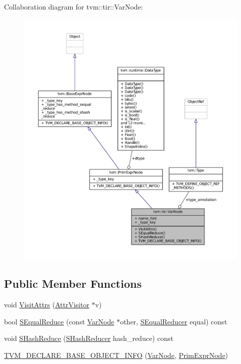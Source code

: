 Collaboration diagram for tvm\+:\+:tir\+:\+:Var\+Node\+:
\nopagebreak
\begin{figure}[H]
\begin{center}
\leavevmode
\includegraphics[width=350pt]{classtvm_1_1tir_1_1VarNode__coll__graph}
\end{center}
\end{figure}
\subsection*{Public Member Functions}
\begin{DoxyCompactItemize}
\item 
void \hyperlink{classtvm_1_1tir_1_1VarNode_a77e835b6ba3c6d26609cbc0b05917e96}{Visit\+Attrs} (\hyperlink{classtvm_1_1AttrVisitor}{Attr\+Visitor} $\ast$v)
\item 
bool \hyperlink{classtvm_1_1tir_1_1VarNode_acdb9c51a2ddd95cedd2a18717dfe585f}{S\+Equal\+Reduce} (const \hyperlink{classtvm_1_1tir_1_1VarNode}{Var\+Node} $\ast$other, \hyperlink{classtvm_1_1SEqualReducer}{S\+Equal\+Reducer} equal) const 
\item 
void \hyperlink{classtvm_1_1tir_1_1VarNode_ad86c6023a45643e8532ac9ef8a4ca910}{S\+Hash\+Reduce} (\hyperlink{classtvm_1_1SHashReducer}{S\+Hash\+Reducer} hash\+\_\+reduce) const 
\item 
\hyperlink{classtvm_1_1tir_1_1VarNode_a629882d57604a710116f12976b40a043}{T\+V\+M\+\_\+\+D\+E\+C\+L\+A\+R\+E\+\_\+\+B\+A\+S\+E\+\_\+\+O\+B\+J\+E\+C\+T\+\_\+\+I\+N\+FO} (\hyperlink{classtvm_1_1tir_1_1VarNode}{Var\+Node}, \hyperlink{classtvm_1_1PrimExprNode}{Prim\+Expr\+Node})
\end{DoxyCompactItemize}
